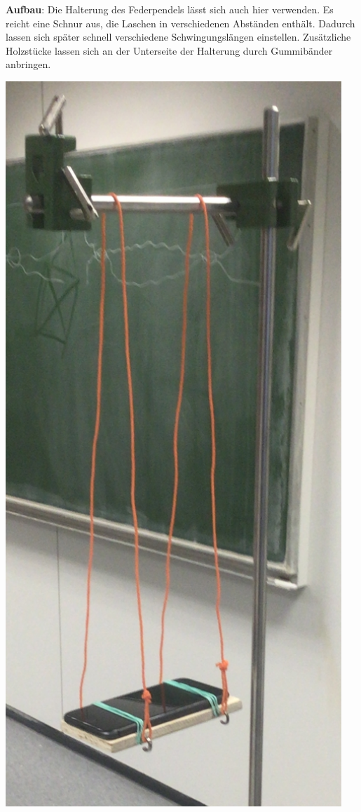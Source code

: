 \documentclass[../main.tex]{subfiles}
\begin{document}
\begin{tcolorbox}
\begin{minipage}[]{0.75\textwidth}
        \vspace{0.5cm}
        \textbf{Aufbau}: Die Halterung des Federpendels lässt sich auch hier verwenden. Es reicht eine Schnur aus, die Laschen in verschiedenen Abständen enthält. Dadurch lassen sich später schnell verschiedene Schwingungslängen einstellen. Zusätzliche Holzstücke lassen sich an der Unterseite der Halterung durch Gummibänder anbringen. 
    \end{minipage}
    \hspace{0.6cm}
    \begin{minipage}[]{0.2\textwidth}
        \includegraphics[width=0.95\textwidth]{img/versuchsaufbau}
    \end{minipage}


\end{tcolorbox}
\end{document}

